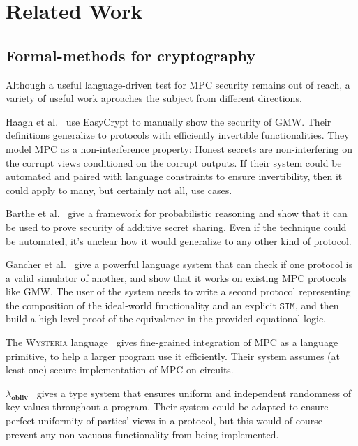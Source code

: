 \documentclass[compsoc, conference, a4paper, 10pt, times]{IEEEtran}
\begin{document}
\section{Related Work}

\subsection{Formal-methods for cryptography}
Although a useful language-driven test for MPC security remains out of reach,
a variety of useful work aproaches the subject from different directions.

Haagh et al.~\cite{haagh2018computer} %
use EasyCrypt to manually show the security of GMW.
Their definitions generalize to protocols with efficiently invertible functionalities.
They model MPC as a non-interference property: Honest secrets are non-interfering on the corrupt views conditioned on the corrupt outputs.
If their system could be automated and paired with language constraints to ensure invertibility,
then it could apply to many, but certainly not all, use cases.

Barthe et al.~\cite{barthe2019probabilistic} %
give a framework for probabilistic reasoning and show that it can be used to prove security of additive secret sharing.
Even if the technique could be automated, it's unclear how it would generalize to any other kind of protocol.

Gancher et al.~\cite{gancher2023core} %
give a powerful language system that can check if one protocol is a valid simulator of another,
and show that it works on existing MPC protocols like GMW.
The user of the system needs to write a second protocol
representing the composition of the ideal-world functionality and an explicit $\mathtt{SIM}$,
and then build a high-level proof of the equivalence in the provided equational logic.

The \textsc{Wysteria} language~\cite{rastogi2014wysteria} %
gives fine-grained integration of MPC as a language primitive, to help a larger program use it efficiently.
Their system assumes (at least one) secure implementation of MPC on circuits.

$\lambda_\textbf{obliv}$~\cite{darais2019language} %
gives a type system that ensures uniform and independent randomness of key values throughout a program.
Their system could be adapted to ensure perfect uniformity of parties' views in a protocol,
but this would of course prevent any non-vacuous functionality from being implemented.
\end{document}
